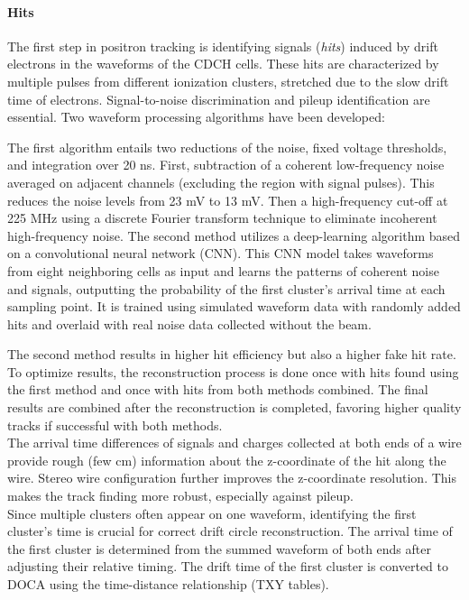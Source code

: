 \begin{refsection}
        \paragraph{Hits} The first step in positron tracking is identifying signals (\textit{hits}) induced by drift electrons in the waveforms of the CDCH cells.
        These hits are characterized by multiple pulses from different ionization clusters, stretched due to the slow drift time of electrons.
        Signal-to-noise discrimination and pileup identification are essential. 
        Two waveform processing algorithms have been developed:
        \begin{outline}
            \1 The first algorithm entails two reductions of the noise, fixed voltage thresholds, and integration over 20 ns.
            First, subtraction of a coherent low-frequency noise averaged on adjacent channels (excluding the region with signal pulses).
            This reduces the noise levels from 23 mV to 13 mV.
            Then a high-frequency cut-off at 225 MHz using a discrete Fourier transform technique to eliminate incoherent high-frequency noise.
            \1 The second method utilizes a deep-learning algorithm based on a convolutional neural network (CNN). This CNN model takes waveforms from eight neighboring cells as input and learns the patterns of coherent noise and signals, outputting the probability of the first cluster's arrival time at each sampling point. It is trained using simulated waveform data with randomly added hits and overlaid with real noise data collected without the beam.
        \end{outline}
        
        \noindent
        The second method results in higher hit efficiency but also a higher fake hit rate. 
        To optimize results, the reconstruction process is done once with hits found using the first method and once with hits from both methods combined. 
        The final results are combined after the reconstruction is completed, favoring higher quality tracks if successful with both methods. \\
        The arrival time differences of signals and charges collected at both ends of a wire provide rough (few cm) information about the z-coordinate of the hit along the wire. 
        Stereo wire configuration further improves the z-coordinate resolution.
        This makes the track finding more robust, especially against pileup. \\
        Since multiple clusters often appear on one waveform, identifying the first cluster's time is crucial for correct drift circle reconstruction. 
        The arrival time of the first cluster is determined from the summed waveform of both ends after adjusting their relative timing. 
        The drift time of the first cluster is converted to DOCA using the time-distance relationship (TXY tables).


\end{refsection}
